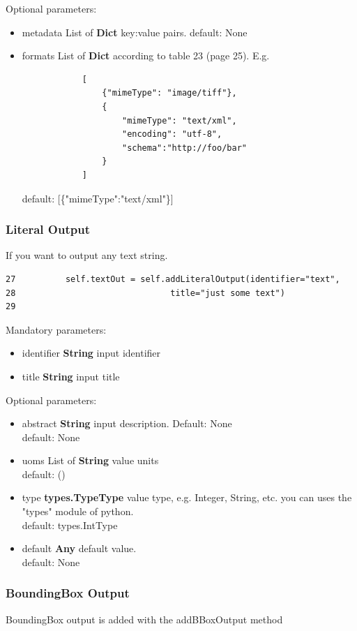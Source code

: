 \documentclass[a4paper,11pt]{report}
\begin{document}
Optional parameters:
\begin{itemize}
\item metadata List of \textbf{Dict} {key:value} pairs.
        default: None
\item formats List of \textbf{Dict} according to table 23 (page 25). E.g.
        \begin{verbatim}
            [
                {"mimeType": "image/tiff"},
                {
                    "mimeType": "text/xml",
                    "encoding": "utf-8",
                    "schema":"http://foo/bar"
                }
            ]
        \end{verbatim}
        default: [\{"mimeType":"text/xml"\}]
\end{itemize}


\subsubsection{Literal Output}
If you want to output any text string.
\begin{verbatim}
27          self.textOut = self.addLiteralOutput(identifier="text",
28                               title="just some text")
29
\end{verbatim}

Mandatory parameters:
\begin{itemize}
\item identifier \textbf{String} input identifier
\item title \textbf{String} input title
\end{itemize}

Optional parameters:
\begin{itemize}
\item abstract \textbf{String} input description. Default: None\\
            default: None
\item uoms List of \textbf{String} value units\\
            default: ()
\item type \textbf{types.TypeType} value type, e.g. Integer, String, etc. you
            can uses the "types" module of python.\\
            default: types.IntType
\item default \textbf{Any} default value.\\
            default: None
\end{itemize}

\subsubsection{BoundingBox Output}
BoundingBox output is added with the addBBoxOutput method
\end{document}

